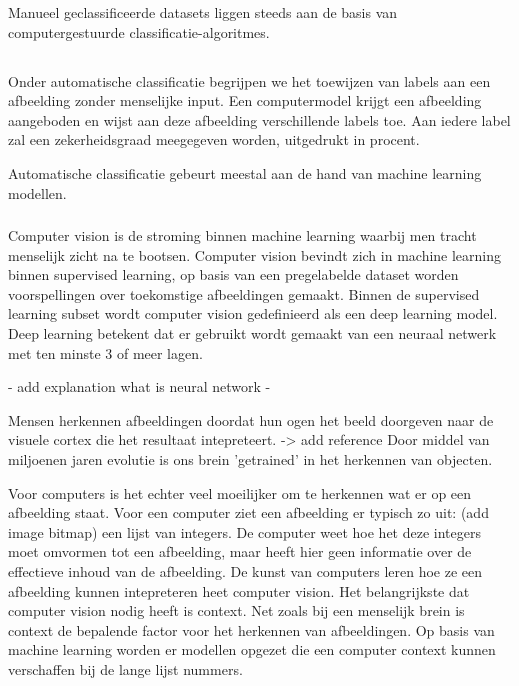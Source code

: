 Manueel geclassificeerde datasets liggen steeds aan de basis van computergestuurde classificatie-algoritmes.

\subsection{}
\label{sec:automatic-classification}
Onder automatische classificatie begrijpen we het toewijzen van labels aan een afbeelding zonder menselijke input. Een computermodel krijgt een afbeelding aangeboden en wijst aan deze afbeelding verschillende labels toe. Aan iedere label zal een zekerheidsgraad meegegeven worden, uitgedrukt in procent.

Automatische classificatie gebeurt meestal aan de hand van machine learning modellen.

\subsubsection{}
\label{sec:computer-vision}
Computer vision is de stroming binnen machine learning waarbij men tracht menselijk zicht na te bootsen. Computer vision bevindt zich in machine learning binnen supervised learning, op basis van een pregelabelde dataset worden voorspellingen over toekomstige afbeeldingen gemaakt.
Binnen de supervised learning subset wordt computer vision gedefinieerd als een deep learning model. Deep learning betekent dat er gebruikt wordt gemaakt van een neuraal netwerk met ten minste 3 of meer lagen.

- add explanation what is neural network -

Mensen herkennen afbeeldingen doordat hun ogen het beeld doorgeven naar de visuele cortex die het resultaat intepreteert. -> add reference
Door middel van miljoenen jaren evolutie is ons brein 'getrained' in het herkennen van objecten.

Voor computers is het echter veel moeilijker om te herkennen wat er op een afbeelding staat. Voor een computer ziet een afbeelding er typisch zo uit:
(add image bitmap) een lijst van integers. De computer weet hoe het deze integers moet omvormen tot een afbeelding, maar heeft hier geen informatie over de effectieve inhoud van de afbeelding.
De kunst van computers leren hoe ze een afbeelding kunnen intepreteren heet computer vision. 
Het belangrijkste dat computer vision nodig heeft is context. Net zoals bij een menselijk brein is context de bepalende factor voor het herkennen van afbeeldingen.
Op basis van machine learning worden er modellen opgezet die een computer context kunnen verschaffen bij de lange lijst nummers.


